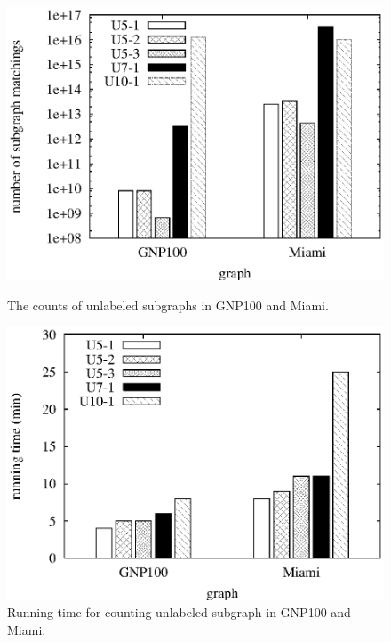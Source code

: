 \begin{figure}[htbp]
\hfill
\begin{minipage}[t]{0.45\linewidth}
\begin{center}
\centerline{\includegraphics[scale=0.35]{plots/unlabel-count.eps}}
\caption{The counts of unlabeled subgraphs in GNP100 and Miami.}
\label{fig:unlabel-counts}
\end{center}
\end{minipage}
\hfill
\begin{minipage}[t]{0.45\linewidth}
\begin{center}
\centerline{\includegraphics[scale=0.35]{plots/unlabel-time.eps}}
\caption{Running time for counting unlabeled subgraph in GNP100 and Miami.}
\label{fig:unlabel-time}
\end{center}
\end{minipage}
\hfill
\end{figure}

